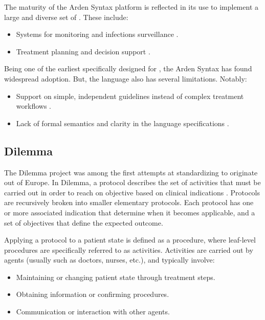 The maturity of the Arden Syntax platform is reflected in its
use to implement a large and diverse set of \CDSSs{}. These
include:
\begin{itemize}
  \item Systems for monitoring and infections surveillance \cite{BlackyACI12,SteinbrecherDC02}.
  \item Treatment planning and decision support \cite{EngeleHealth11,BoeglAMIA05}.
\end{itemize}

Being one of the earliest \DSLs{} specifically designed for \CDSSs{}, the
Arden Syntax has found widespread adoption. But, the language also has several
limitations. Notably:
\begin{itemize}
  \item Support on simple, independent guidelines instead of complex treatment
  workflows \cite{ClerqAIM03}.
  \item Lack of formal semantics and clarity in the language specifications \cite{SamwaldJBI12}.
\end{itemize}

\subsection{Dilemma}\label{sec:dilemma}

The Dilemma project was among the first attempts at
standardizing \BPGs{} to originate out of Europe. In Dilemma, a
protocol describes the set of activities that must be carried out
in order to reach on objective based on clinical indications \cite{HerbertMPB95}.
Protocols are recursively broken into smaller elementary protocols. Each
protocol has one or more associated indication that determine when
it becomes applicable, and a set of objectives that define the expected
outcome.

Applying a protocol to a patient state is defined as a procedure, where
leaf-level procedures are specifically referred to as activities. Activities
are carried out by agents (usually \HCPs{} such as doctors, nurses, etc.),
and typically involve:
\begin{itemize}
  \item Maintaining or changing patient state through treatment steps.
  \item Obtaining information or confirming procedures.
  \item Communication or interaction with other agents.
\end{itemize}

